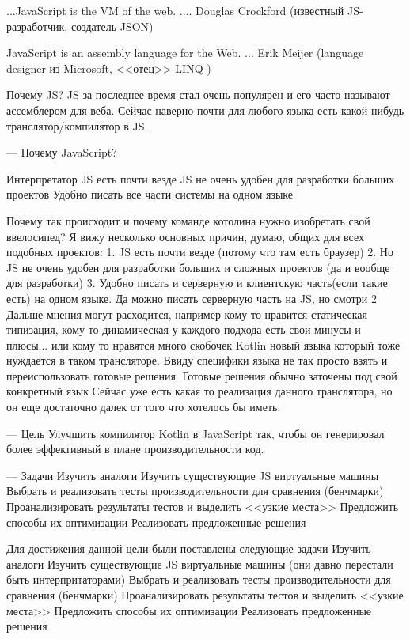 ...JavaScript is the VM of the web. ....
Douglas Crockford (известный JS-разработчик, создатель JSON)

JavaScript is an assembly language for the Web. ...
Erik Meijer (language designer из Microsoft,
<<отец>> LINQ )

Почему JS? JS за последнее время стал очень популярен и его часто называют ассемблером для веба. Сейчас наверно почти для любого языка есть какой нибудь транслятор/компилятор в JS. 

---
Почему JavaScript?

Интерпретатор JS есть почти везде
JS не очень удобен для разработки больших проектов
Удобно писать все части системы на одном языке



Почему так происходит и почему команде котолина нужно изобретать свой ввелосипед? Я вижу несколько основных причин, думаю, общих для всех подобных проектов:
1. JS есть почти везде (потому что там есть браузер)
2. Но JS не очень удобен для разработки больших и сложных проектов (да и вообще для разработки)
3. Удобно писать и серверную и клиентскую часть(если такие есть) на одном языке. Да можно писать серверную часть на JS, но смотри 2
Дальше мнения могут расходится, например кому то нравится статическая типизация, кому то динамическая у каждого подхода есть свои минусы и плюсы...
или кому то нравятся много скобочек
Kotlin новый языка который тоже нуждается в таком трансляторе.
Ввиду специфики языка не так просто взять и переиспользовать готовые решения. Готовые решения обычно заточены под свой конкретный язык
Сейчас уже есть какая то реализация данного транслятора, но он еще достаточно далек от того что хотелось бы иметь.

---
Цель
Улучшить компилятор Kotlin в JavaScript так, чтобы он генерировал более эффективный в плане производительности код.

---
Задачи
Изучить аналоги
Изучить существующие JS виртуальные машины
Выбрать и реализовать тесты производительности для сравнения (бенчмарки)
Проанализировать результаты тестов и выделить <<узкие места>>
Предложить способы их оптимизации
Реализовать предложенные решения

Для достижения данной цели были поставлены следующие задачи
Изучить аналоги
Изучить существующие JS виртуальные машины (они давно перестали быть интерпритаторами)
Выбрать и реализовать тесты производительности для сравнения (бенчмарки)
Проанализировать результаты тестов и выделить <<узкие места>>
Предложить способы их оптимизации
Реализовать предложенные решения



